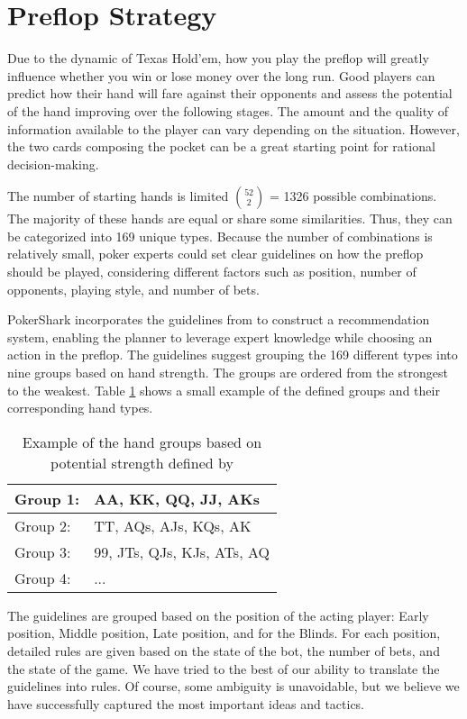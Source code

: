\section{Preflop Strategy}

Due to the dynamic of Texas Hold'em, how you play the preflop will greatly influence whether you win or lose money over the long run.
Good players can predict how their hand will fare against their opponents and assess the potential of the hand improving over the following stages. The amount and the quality of information available to the player can vary depending on the situation. However, the two cards composing the pocket can be a great starting point for rational decision-making.

The number of starting hands is limited ${52 \choose 2}$ = 1326 possible combinations. The majority of these hands are equal or share some similarities. Thus, they can be categorized into 169 unique types. Because the number of combinations is relatively small, poker experts could set clear guidelines on how the preflop should be played, considering different factors such as position, number of opponents, playing style, and number of bets.

PokerShark incorporates the guidelines from \cite{sklansky_2003} to construct a recommendation system, enabling the planner to leverage expert knowledge while choosing an action in the preflop.  The guidelines suggest grouping the 169 different types into nine groups based on hand strength. The groups are ordered from the strongest to the weakest. Table \ref{tab:handGroups} shows a small example of the defined groups and their corresponding hand types.

\begin{table}[h]
    \centering
    \begin{tabular}{|l|l|}
        \hline
        Group 1: & AA, KK, QQ, JJ, AKs        \\ \hline
        Group 2: & TT, AQs, AJs, KQs, AK      \\ \hline
        Group 3: & 99, JTs, QJs, KJs, ATs, AQ \\ \hline
        Group 4: & ...                        \\ \hline
    \end{tabular}
    \caption{Example of the hand groups based on potential strength defined by \cite{sklansky_2003}}
    \label{tab:handGroups}
\end{table}

The guidelines are grouped based on the position of the acting player: Early position, Middle position, Late position, and for the Blinds.
For each position, detailed rules are given based on the state of the bot, the number of bets, and the state of the game. We have tried to the best of our ability to translate the guidelines into rules. Of course, some ambiguity is unavoidable, but we believe we have successfully captured the most important ideas and tactics.

